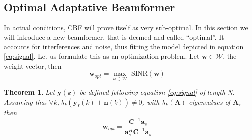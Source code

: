 \documentclass[12pt]{article}
\newtheorem{theorem}{Theorem}
\begin{document}
\subsection{Optimal Adaptative Beamformer}\label{sec:opt}
In actual conditions, CBF will prove itself as very sub-optimal. In this section we will introduce a new beamformer, that is deemed and called ``optimal''. It accounts for interferences and noise, thus fitting the model depicted in equation \ref{eq:signal}. Let us formulate this as an optimization problem. Let $\mathbf{w}\in\mathcal{W}$, the weight vector, then
\begin{equation}
    \mathbf{w}_{opt} = \max_{w\in\mathcal{W}}  \text{ SINR}(\mathbf{w})
\end{equation}
\begin{theorem}\label{thm:wopt}
    Let $\mathbf{y}(k)$ be defined following equation \ref{eq:signal} of length N. Assuming that $\forall k, \lambda_k(\mathbf{y}_I(k)+\mathbf{n}(k)) \neq 0$, with $\lambda_k(\mathbf{A})$ eigenvalues of $\mathbf{A}$, then 
    \begin{equation}\label{eq:wopt}
        \mathbf{w}_{opt} = \frac{\mathbf{C}^{-1}\mathbf{a}_s}{\mathbf{a}_s^H\mathbf{C}^{-1}\mathbf{a}_s}
    \end{equation}
\end{theorem}
\end{document}
